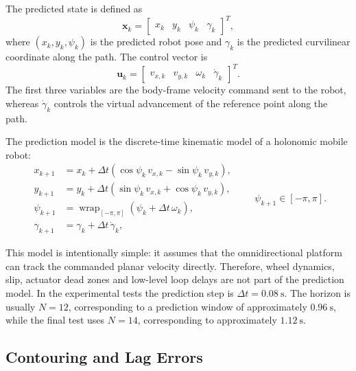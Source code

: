 The predicted state is defined as
\begin{equation}
    \mathbf{x}_k =
    \begin{bmatrix}
        x_k & y_k & \psi_k & \gamma_k
    \end{bmatrix}^{T},
\end{equation}
where \((x_k,y_k,\psi_k)\) is the predicted robot pose and \(\gamma_k\) is the
predicted curvilinear coordinate along the path.  The control vector is
\begin{equation}
    \mathbf{u}_k =
    \begin{bmatrix}
        v_{x,k} & v_{y,k} & \omega_k & \dot{\gamma}_k
    \end{bmatrix}^{T}.
\end{equation}
The first three variables are the body-frame velocity command sent to the robot,
whereas \(\dot{\gamma}_k\) controls the virtual advancement of the reference
point along the path.

The prediction model is the discrete-time kinematic model of a holonomic mobile
robot:
\begin{equation}
\begin{aligned}
    x_{k+1} &= x_k + \Delta t
    \left(\cos\psi_k\,v_{x,k}-\sin\psi_k\,v_{y,k}\right), \\
    y_{k+1} &= y_k + \Delta t
    \left(\sin\psi_k\,v_{x,k}+\cos\psi_k\,v_{y,k}\right), \\
    \psi_{k+1} &= \operatorname{wrap}_{[-\pi,\pi]}
    \!\left(\psi_k + \Delta t\,\omega_k\right), \\
    \gamma_{k+1} &= \gamma_k + \Delta t\,\dot{\gamma}_k,
\end{aligned}
\qquad
\psi_{k+1}\in[-\pi,\pi].
\end{equation}

\vspace{0.2cm}

This model is intentionally simple: it assumes that the omnidirectional platform
can track the commanded planar velocity directly.  Therefore, wheel dynamics,
slip, actuator dead zones and low-level loop delays are not part of the
prediction model.  In the experimental tests the prediction step is
\(\Delta t=0.08~\mathrm{s}\).  The horizon is usually \(N=12\), corresponding to
a prediction window of approximately \(0.96~\mathrm{s}\), while the final test
uses \(N=14\), corresponding to approximately \(1.12~\mathrm{s}\).

\subsection{Contouring and Lag Errors}

